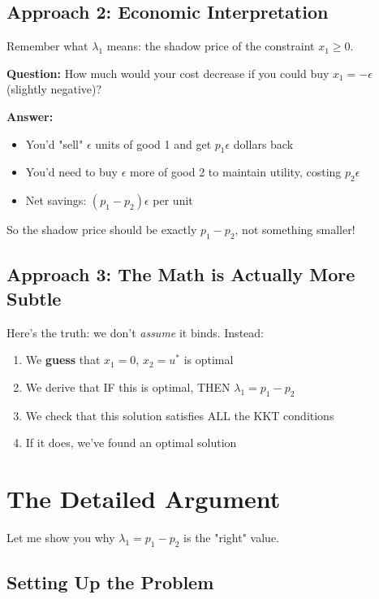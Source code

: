 \documentclass[11pt]{article}
\begin{document}
\subsection{Approach 2: Economic Interpretation}

Remember what $\lambda_1$ means: the shadow price of the constraint $x_1 \geq 0$.

\textbf{Question:} How much would your cost decrease if you could buy $x_1 = -\epsilon$ (slightly negative)?

\textbf{Answer:}
\begin{itemize}
\item You'd "sell" $\epsilon$ units of good 1 and get $p_1 \epsilon$ dollars back
\item You'd need to buy $\epsilon$ more of good 2 to maintain utility, costing $p_2 \epsilon$
\item Net savings: $(p_1 - p_2) \epsilon$ per unit
\end{itemize}

So the shadow price should be exactly $p_1 - p_2$, not something smaller!

\subsection{Approach 3: The Math is Actually More Subtle}

Here's the truth: we don't \textit{assume} it binds. Instead:

\begin{enumerate}
\item We \textbf{guess} that $x_1 = 0$, $x_2 = u^*$ is optimal
\item We derive that IF this is optimal, THEN $\lambda_1 = p_1 - p_2$
\item We check that this solution satisfies ALL the KKT conditions
\item If it does, we've found an optimal solution
\end{enumerate}

\section{The Detailed Argument}

Let me show you why $\lambda_1 = p_1 - p_2$ is the "right" value.

\subsection{Setting Up the Problem}
\end{document}
